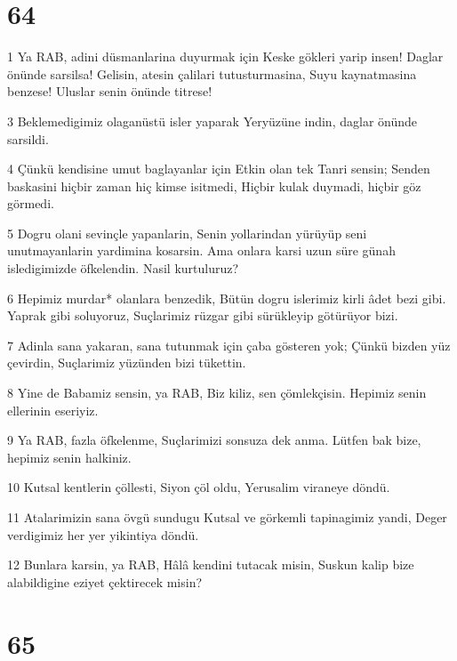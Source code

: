 \chapter{64}

\par 1 Ya RAB, adini düsmanlarina duyurmak için Keske gökleri yarip insen! Daglar önünde sarsilsa! Gelisin, atesin çalilari tutusturmasina, Suyu kaynatmasina benzese! Uluslar senin önünde titrese!
\par 3 Beklemedigimiz olaganüstü isler yaparak Yeryüzüne indin, daglar önünde sarsildi.
\par 4 Çünkü kendisine umut baglayanlar için Etkin olan tek Tanri sensin; Senden baskasini hiçbir zaman hiç kimse isitmedi, Hiçbir kulak duymadi, hiçbir göz görmedi.
\par 5 Dogru olani sevinçle yapanlarin, Senin yollarindan yürüyüp seni unutmayanlarin yardimina kosarsin. Ama onlara karsi uzun süre günah isledigimizde öfkelendin. Nasil kurtuluruz?
\par 6 Hepimiz murdar* olanlara benzedik, Bütün dogru islerimiz kirli âdet bezi gibi. Yaprak gibi soluyoruz, Suçlarimiz rüzgar gibi sürükleyip götürüyor bizi.
\par 7 Adinla sana yakaran, sana tutunmak için çaba gösteren yok; Çünkü bizden yüz çevirdin, Suçlarimiz yüzünden bizi tükettin.
\par 8 Yine de Babamiz sensin, ya RAB, Biz kiliz, sen çömlekçisin. Hepimiz senin ellerinin eseriyiz.
\par 9 Ya RAB, fazla öfkelenme, Suçlarimizi sonsuza dek anma. Lütfen bak bize, hepimiz senin halkiniz.
\par 10 Kutsal kentlerin çöllesti, Siyon çöl oldu, Yerusalim viraneye döndü.
\par 11 Atalarimizin sana övgü sundugu Kutsal ve görkemli tapinagimiz yandi, Deger verdigimiz her yer yikintiya döndü.
\par 12 Bunlara karsin, ya RAB, Hâlâ kendini tutacak misin, Suskun kalip bize alabildigine eziyet çektirecek misin?

\chapter{65}

